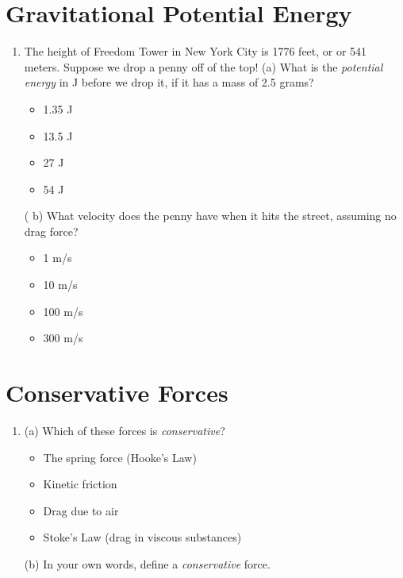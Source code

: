 \documentclass[10pt]{article}
\begin{document}
\section{Gravitational Potential Energy}
\begin{enumerate}
\item The height of Freedom Tower in New York City is 1776 feet, or or 541 meters.  Suppose we drop a penny off of the top!  (a) What is the \textit{potential energy} in J before we drop it, if it has a mass of 2.5 grams?
\begin{itemize}
\item 1.35 J
\item 13.5 J
\item 27 J
\item 54 J
\end{itemize}(
b) What velocity does the penny have when it hits the street, assuming no drag force?
\begin{itemize}
\item 1 m/s
\item 10 m/s
\item 100 m/s
\item 300 m/s
\end{itemize}
\end{enumerate}
\section{Conservative Forces}
\begin{enumerate}
\item (a) Which of these forces is \textit{conservative}?
\begin{itemize}
\item The spring force (Hooke's Law)
\item Kinetic friction
\item Drag due to air
\item Stoke's Law (drag in viscous substances)
\end{itemize}
(b) In your own words, define a \textit{conservative} force.
\end{enumerate}
\end{document}
